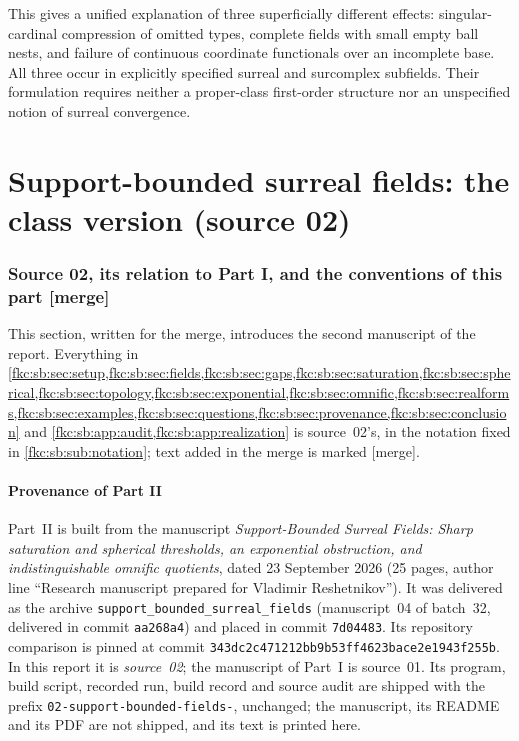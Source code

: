 \documentclass[11pt,letterpaper]{article}
\numberwithin{equation}{section}
\theoremstyle{definition}
\theoremstyle{remark}
\newcommand{\mergetag}{\textup{\textsf{\small[merge]}}}%
\begin{document}
This gives a unified explanation of three superficially different effects: singular-cardinal compression of omitted types, complete fields with small empty ball nests, and failure of continuous coordinate functionals over an incomplete base. All three occur in explicitly specified surreal and surcomplex subfields. Their formulation requires neither a proper-class first-order structure nor an unspecified notion of surreal convergence.

\part{Support-bounded surreal fields: the class version (source 02)}
\label{fkc:sb:part:class}

\section{Source 02, its relation to Part I, and the conventions of this part \mergetag}
\label{fkc:sb:sec:intro}

This section, written for the merge, introduces the second manuscript of the report. Everything in \cref{fkc:sb:sec:setup,fkc:sb:sec:fields,fkc:sb:sec:gaps,fkc:sb:sec:saturation,fkc:sb:sec:spherical,fkc:sb:sec:topology,fkc:sb:sec:exponential,fkc:sb:sec:omnific,fkc:sb:sec:realforms,fkc:sb:sec:examples,fkc:sb:sec:questions,fkc:sb:sec:provenance,fkc:sb:sec:conclusion} and \cref{fkc:sb:app:audit,fkc:sb:app:realization} is source~02's, in the notation fixed in \cref{fkc:sb:sub:notation}; text added in the merge is marked \mergetag.

\subsection{Provenance of Part II}
\label{fkc:sb:sub:provenance}
Part~II is built from the manuscript \emph{Support-Bounded Surreal Fields: Sharp saturation and spherical thresholds, an exponential obstruction, and indistinguishable omnific quotients}, dated 23 September 2026 (25 pages, author line ``Research manuscript prepared for Vladimir Reshetnikov''). It was delivered as the archive \texttt{support\_bounded\_surreal\_fields} (manuscript~04 of batch~32, delivered in commit \texttt{aa268a4}) and placed in commit \texttt{7d04483}. Its repository comparison is pinned at commit \texttt{343dc2c471212bb9b53ff4623bace2e1943f255b}. In this report it is \emph{source~02}; the manuscript of Part~I is source~01. Its program, build script, recorded run, build record and source audit are shipped with the prefix \texttt{02-support-bounded-fields-}, unchanged; the manuscript, its README and its PDF are not shipped, and its text is printed here.
\end{document}
